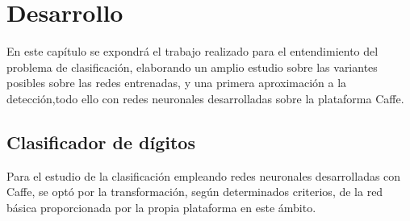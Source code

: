 \chapter{Desarrollo}\label{cap.desarrollo}
En este capítulo se expondrá el trabajo realizado para el entendimiento del problema de clasificación, elaborando un amplio estudio sobre las variantes posibles sobre las redes entrenadas, y una primera aproximación a la detección,todo ello con redes neuronales desarrolladas sobre la plataforma Caffe.\\
\section{Clasificador de dígitos}
Para el estudio de la clasificación empleando redes neuronales desarrolladas con Caffe, se optó por la transformación, según determinados criterios, de la red básica proporcionada por la propia plataforma en este ámbito.\\
